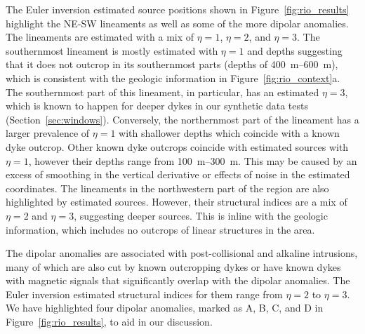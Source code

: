 The Euler inversion estimated source positions shown in
Figure~\ref{fig:rio_results} highlight the NE-SW lineaments as well as some of
the more dipolar anomalies.
The lineaments are estimated with a mix of $\eta=1$, $\eta=2$, and $\eta=3$.
The southernmost lineament is mostly estimated with $\eta=1$ and depths
suggesting that it does not outcrop in its southernmost parts (depths of
\qtyrange{400}{600}{\m}), which is consistent with the geologic information in
Figure~\ref{fig:rio_context}a. The southernmost part of this lineament, in
particular, has an estimated $\eta=3$, which is known to happen for deeper
dykes in our synthetic data tests (Section~\ref{sec:windows}). Conversely, the
northernmost part of the lineament has a larger prevalence of $\eta=1$ with
shallower depths which coincide with a known dyke outcrop.
Other known dyke outcrops coincide with estimated sources with $\eta=1$,
however their depths range from \qtyrange{100}{300}{\m}. This may be caused by
an excess of smoothing in the vertical derivative or effects of noise in the
estimated coordinates. The lineaments in the northwestern part of the region
are also highlighted by estimated sources.
However, their structural indices are a mix of $\eta=2$ and $\eta=3$,
suggesting deeper sources. This is inline with the geologic information, which
includes no outcrops of linear structures in the area.

The dipolar anomalies are associated with post-collisional and alkaline
intrusions, many of which are also cut by known outcropping dykes or have known
dykes with magnetic signals that significantly overlap with the dipolar
anomalies. The Euler inversion estimated structural indices for them range from
$\eta=2$ to $\eta=3$. We have highlighted four dipolar anomalies, marked as A,
B, C, and D in Figure~\ref{fig:rio_results}, to aid in our discussion.

